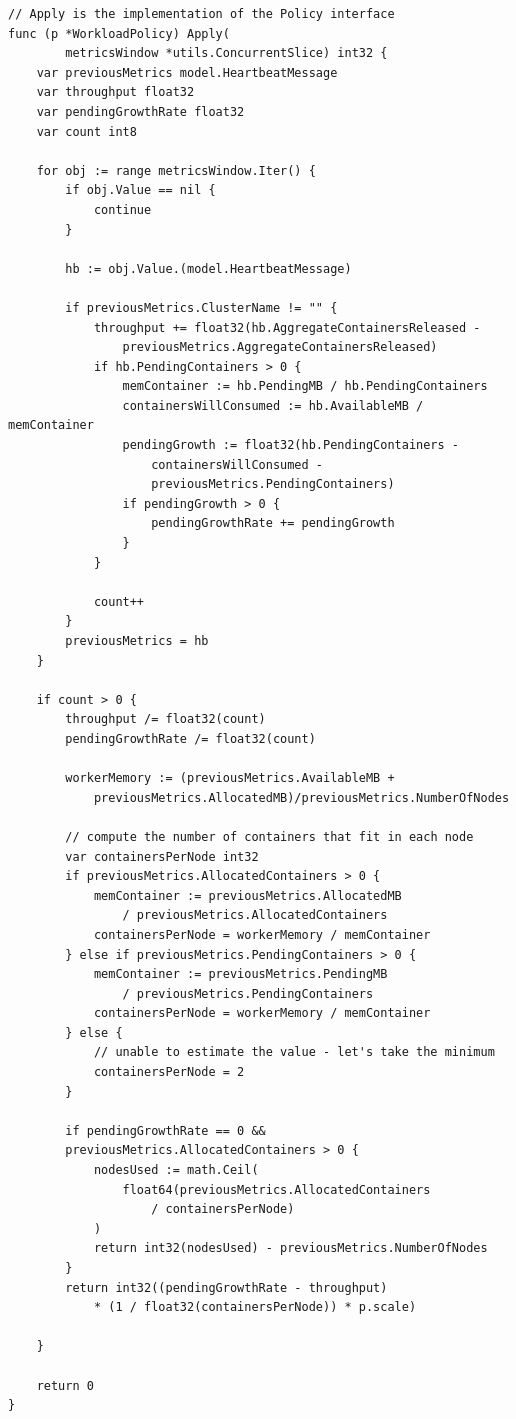 \documentclass[12pt,twoside,cucitura]{toptesi}
\begin{document}
\begin{lstlisting}[caption={The implementation  of the autoscaling policy.},label={lst:policy-autoscaler}]
// Apply is the implementation of the Policy interface
func (p *WorkloadPolicy) Apply(
		metricsWindow *utils.ConcurrentSlice) int32 {
	var previousMetrics model.HeartbeatMessage
	var throughput float32
	var pendingGrowthRate float32
	var count int8

	for obj := range metricsWindow.Iter() {
		if obj.Value == nil {
			continue
		}

		hb := obj.Value.(model.HeartbeatMessage)

		if previousMetrics.ClusterName != "" {
			throughput += float32(hb.AggregateContainersReleased - 
				previousMetrics.AggregateContainersReleased)
			if hb.PendingContainers > 0 {
				memContainer := hb.PendingMB / hb.PendingContainers
				containersWillConsumed := hb.AvailableMB / memContainer
				pendingGrowth := float32(hb.PendingContainers - 
					containersWillConsumed - 
					previousMetrics.PendingContainers)
				if pendingGrowth > 0 {
					pendingGrowthRate += pendingGrowth
				}
			}

			count++
		}
		previousMetrics = hb
	}

	if count > 0 {
		throughput /= float32(count)
		pendingGrowthRate /= float32(count)

		workerMemory := (previousMetrics.AvailableMB + 
			previousMetrics.AllocatedMB)/previousMetrics.NumberOfNodes

		// compute the number of containers that fit in each node
		var containersPerNode int32
		if previousMetrics.AllocatedContainers > 0 {
			memContainer := previousMetrics.AllocatedMB 
				/ previousMetrics.AllocatedContainers
			containersPerNode = workerMemory / memContainer
		} else if previousMetrics.PendingContainers > 0 {
			memContainer := previousMetrics.PendingMB 
				/ previousMetrics.PendingContainers
			containersPerNode = workerMemory / memContainer
		} else {
			// unable to estimate the value - let's take the minimum
			containersPerNode = 2
		}

		if pendingGrowthRate == 0 && 
		previousMetrics.AllocatedContainers > 0 {
			nodesUsed := math.Ceil(
				float64(previousMetrics.AllocatedContainers 
					/ containersPerNode)
			)
			return int32(nodesUsed) - previousMetrics.NumberOfNodes
		}
		return int32((pendingGrowthRate - throughput) 
			* (1 / float32(containersPerNode)) * p.scale)

	}

	return 0
}
\end{lstlisting}
\end{document}
